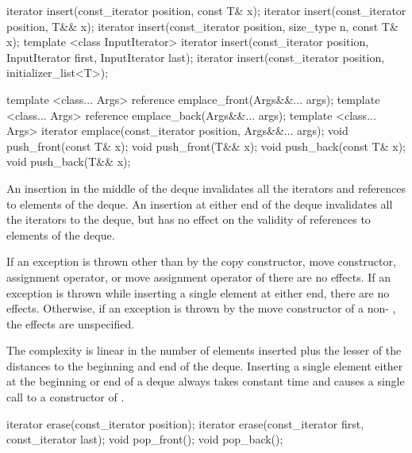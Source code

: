 %
%
%
%
\begin{itemdecl}
iterator insert(const_iterator position, const T& x);
iterator insert(const_iterator position, T&& x);
iterator insert(const_iterator position, size_type n, const T& x);
template <class InputIterator>
  iterator insert(const_iterator position,
                  InputIterator first, InputIterator last);
iterator insert(const_iterator position, initializer_list<T>);

template <class... Args> reference emplace_front(Args&&... args);
template <class... Args> reference emplace_back(Args&&... args);
template <class... Args> iterator emplace(const_iterator position, Args&&... args);
void push_front(const T& x);
void push_front(T&& x);
void push_back(const T& x);
void push_back(T&& x);
\end{itemdecl}

\begin{itemdescr}
\pnum
\effects
An insertion in the middle of the deque invalidates all the iterators and
references to elements of the deque.
An insertion at either end of the
deque invalidates all the iterators to the deque, but has no effect on
the validity of references to elements of the deque.

\pnum
\remarks
If an exception is thrown other than by the
copy constructor, move constructor,
assignment operator, or move assignment operator of
there are no effects.
If an exception is thrown while inserting a single element at either end,
there are no effects.
Otherwise, if an exception is thrown by the move constructor of a
non-
, the effects are unspecified.

\pnum
\complexity
The complexity is linear in the number of elements inserted plus the lesser
of the distances to the beginning and end of the deque.
Inserting a single element either at the beginning or end of a deque always takes constant time
and causes a single call to a constructor of
.
\end{itemdescr}

%
\begin{itemdecl}
iterator erase(const_iterator position);
iterator erase(const_iterator first, const_iterator last);
void pop_front();
void pop_back();
\end{itemdecl}

